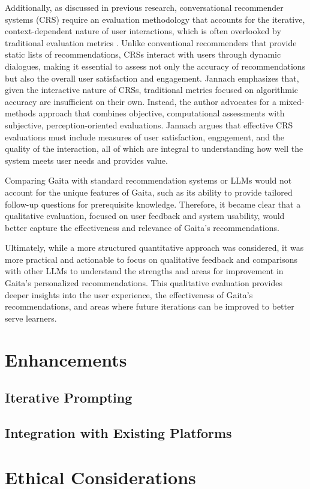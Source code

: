 Additionally, as discussed in previous research, conversational recommender systems (CRS) require an evaluation methodology that accounts for the iterative, context-dependent nature of user interactions, which is often overlooked by traditional evaluation metrics \cite{jannach_evaluating_2023}. Unlike conventional recommenders that provide static lists of recommendations, CRSs interact with users through dynamic dialogues, making it essential to assess not only the accuracy of recommendations but also the overall user satisfaction and engagement. Jannach emphasizes that, given the interactive nature of CRSs, traditional metrics focused on algorithmic accuracy are insufficient on their own. Instead, the author advocates for a mixed-methods approach that combines objective, computational assessments with subjective, perception-oriented evaluations. Jannach argues that effective CRS evaluations must include measures of user satisfaction, engagement, and the quality of the interaction, all of which are integral to understanding how well the system meets user needs and provides value.

Comparing Gaita with standard recommendation systems or LLMs would not account for the unique features of Gaita, such as its ability to provide tailored follow-up questions for prerequisite knowledge. Therefore, it became clear that a qualitative evaluation, focused on user feedback and system usability, would better capture the effectiveness and relevance of Gaita’s recommendations.

Ultimately, while a more structured quantitative approach was considered, it was more practical and actionable to focus on qualitative feedback and comparisons with other LLMs to understand the strengths and areas for improvement in Gaita’s personalized recommendations. This qualitative evaluation provides deeper insights into the user experience, the effectiveness of Gaita’s recommendations, and areas where future iterations can be improved to better serve learners.


\section{Enhancements}

\subsection{Iterative Prompting}

\subsection{Integration with Existing Platforms}

\section{Ethical Considerations}

